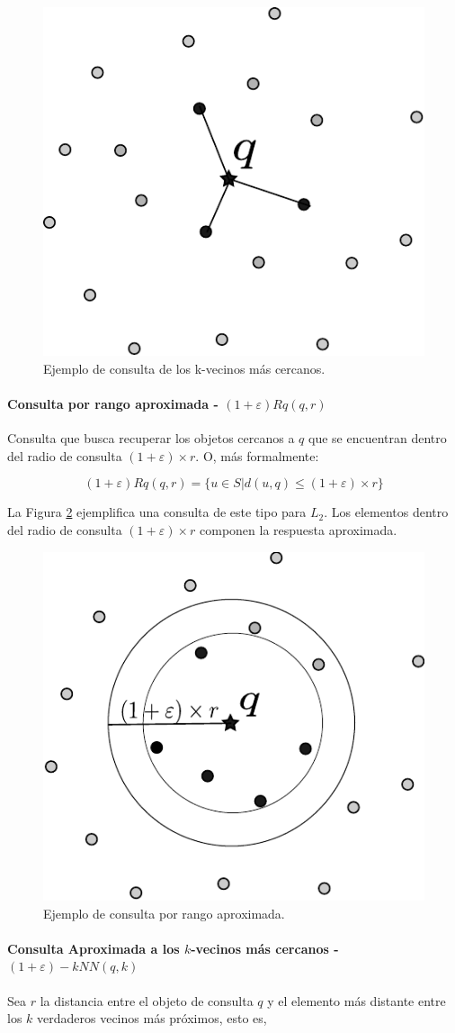 \begin{figure}[htp]
\centering
\includegraphics[width=0.28\columnwidth]{chapter2/knn_query.pdf}
\caption{Ejemplo  de consulta de los k-vecinos más cercanos.}
\label{fig:knnQuery}
\end{figure}
 

\paragraph{Consulta por rango aproximada - $(1 + \varepsilon)  Rq(q, r)$}

Consulta que busca recuperar los objetos cercanos a $q$ que se encuentran dentro del radio de consulta  $(1 + \varepsilon) \times r$. O, más formalmente:

\begin{equation}
    (1 + \varepsilon) Rq(q, r) = \{ u \in S | d(u, q) \leq (1 + \varepsilon) \times r \}
\end{equation}

La Figura \ref{fig:AproximateRangeQuery} ejemplifica una consulta de este tipo para $L_2$. Los elementos dentro del radio de consulta  $(1 + \varepsilon)\times r$ componen la respuesta aproximada.
\begin{figure}[htp]
\centering
\includegraphics[width=0.32\columnwidth]{chapter2/app-range_query.pdf}
\caption{Ejemplo de consulta  por  rango aproximada.}
\label{fig:AproximateRangeQuery}
\end{figure}


\paragraph{Consulta Aproximada a los $k$-vecinos más cercanos  - $(1 + \varepsilon) - kNN(q, k)$}
Sea $r$ la distancia entre el objeto de consulta $q$ y el elemento más distante entre los $k$ verdaderos vecinos más próximos, esto es,

